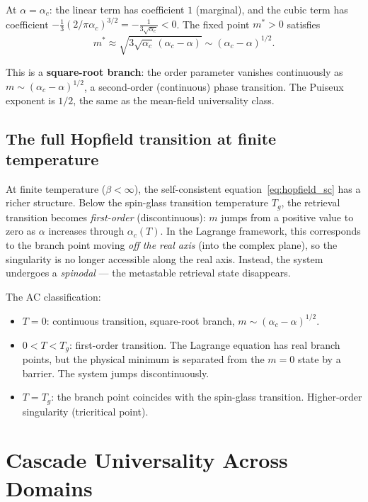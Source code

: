 \documentclass[11pt,a4paper]{article}
\theoremstyle{definition}
\begin{document}
At $\alpha = \alpha_c$: the linear term has coefficient $1$ (marginal),
and the cubic term has coefficient $-\frac{1}{3}(2/\pi\alpha_c)^{3/2}
= -\frac{1}{3\sqrt{\alpha_c}} < 0$. The fixed point $m^* > 0$ satisfies
\begin{equation}
m^* \approx \sqrt{3\sqrt{\alpha_c}\,(\alpha_c - \alpha)} \sim
(\alpha_c - \alpha)^{1/2}.
\end{equation}

This is a \textbf{square-root branch}: the order parameter vanishes
continuously as $m \sim (\alpha_c - \alpha)^{1/2}$, a second-order
(continuous) phase transition. The Puiseux exponent is $1/2$, the same
as the mean-field universality class.

\subsection{The full Hopfield transition at finite temperature}

At finite temperature ($\beta < \infty$), the self-consistent
equation~\eqref{eq:hopfield_sc} has a richer structure. Below the
spin-glass transition temperature $T_g$, the retrieval transition
becomes \emph{first-order} (discontinuous): $m$ jumps from a positive
value to zero as $\alpha$ increases through $\alpha_c(T)$. In the
Lagrange framework, this corresponds to the branch point moving
\emph{off the real axis} (into the complex plane), so the singularity
is no longer accessible along the real axis. Instead, the system
undergoes a \emph{spinodal} --- the metastable retrieval state
disappears.

The AC classification:
\begin{itemize}[leftmargin=2em]
\item $T = 0$: continuous transition, square-root branch, $m \sim (\alpha_c - \alpha)^{1/2}$.
\item $0 < T < T_g$: first-order transition. The Lagrange equation has
  real branch points, but the physical minimum is separated from the
  $m = 0$ state by a barrier. The system jumps discontinuously.
\item $T = T_g$: the branch point coincides with the spin-glass
  transition. Higher-order singularity (tricritical point).
\end{itemize}


\section{Cascade Universality Across Domains}
\label{sec:universality}
\end{document}
